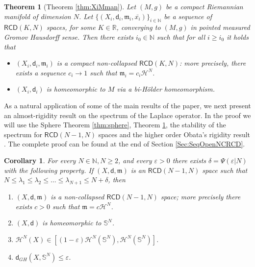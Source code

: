 \documentclass[a4paper]{amsart}
\theoremstyle{plain}
\newtheorem{theorem}[lemma]{Theorem}
\newtheorem{corollary}[lemma]{Corollary}
\theoremstyle{definition}
\numberwithin{equation}{section}
\newcommand{\R}{\mathbb{R}}
\newcommand{\N}{\mathbb{N}}
\newcommand{\RCD}{\mathsf{RCD}}
\newcommand{\mm}{\mathfrak m}
\newcommand{\sfd}{\mathsf d}
\newcommand{\cH}{\mathcal{H}}
\begin{document}
{\begin{theorem}[Theorem \ref{thm:XiMman}]\label{thm:XiMmanIntro} 
Let $(M,g)$ be a compact Riemannian manifold of dimension $N$. Let $\{(X_{i}, \sfd_{i},\mm_{i}, \bar{x_{i}})\}_{i\in \N}$ be a sequence of $\RCD(K,N)$ spaces, for some $K\in \R$,  converging to 
$(M,g)$ in pointed measured Gromov Hausdorff sense. Then there exists $i_{0}\in \N$ such that  for all $i\ge i_0$ it holds that
\begin{itemize}
\item $(X_{i}, \sfd_{i},\mm_{i})$ is a compact non-collapsed $\RCD(K,N)$: more precisely, there exists a sequence $c_{i}\to 1$ such that $\mm_{i}=c_{i} \cH^{N}$.
\item $(X_{i}, \sfd_{i})$ is homeomorphic to $M$ via a bi-H\"older homeomorphism.
\end{itemize}
\end{theorem}

{ 
As a natural application of some of the main results of the paper, we next present an almost-rigidity result on the spectrum of the Laplace operator. In the proof we will use the  Sphere Theorem \ref{thm:sphere}, Theorem \ref {thm:XiMmanIntro},  the stability of the spectrum for $\RCD(N-1,N)$ spaces \cite[Theorem 7.8]{GMS2013} and the higher order Obata's  rigidity result \cite[Theorem 1.4]{ketterer3}. { The complete proof can be found at the end of Section \ref{Sec:SeqOpenNCRCD}.}

\begin{corollary}\label{eq:lambda1N=N}
For every  $N\in \N, N\geq 2$, and every  $\varepsilon>0$ there exists $\delta=\Psi(\varepsilon|N)$ with the following property.
If $(X,\sfd,\mm)$ is an $\RCD(N-1,N)$ space such that $N\leq \lambda_{1}\leq \lambda_{2}\leq \ldots \leq \lambda_{N+1} \leq N+\delta$, then 
\begin{enumerate}
\item  $(X,\sfd,\mm)$ is a non-collapsed  $\RCD(N-1,N)$ space; more precisely there exists $c>0$ such that $\mm=c\cH^{N}$.
\item  $(X,\sfd)$ is homeomorphic to ${\mathbb S}^{N}$.
\item  $\cH^{N}(X)\in \left[(1-\varepsilon) \cH^{N}(\mathbb S^{N}),  \cH^{N}(\mathbb S^{N}) \right]$.
\item $\sfd_{GH} (X,{\mathbb S}^{N})\leq \varepsilon.$
\end{enumerate}
\end{corollary}


}}
\end{document}
